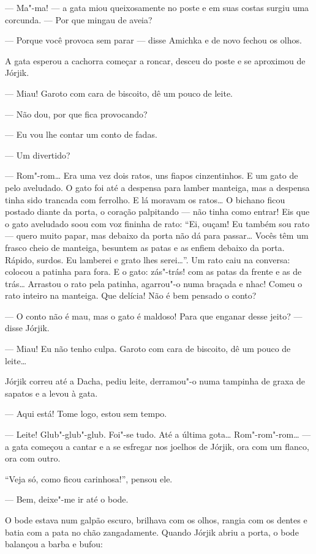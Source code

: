 --- Ma"-ma! --- a gata miou queixosamente no poste e em suas costas
surgiu uma corcunda. --- Por que mingau de aveia?

--- Porque você provoca sem parar --- disse Amichka e de novo fechou os
olhos.

A gata esperou a cachorra começar a roncar, desceu do poste e se
aproximou de Jórjik.

--- Miau! Garoto com cara de biscoito, dê um pouco de leite.

--- Não dou, por que fica provocando?

--- Eu vou lhe contar um conto de fadas.

--- Um divertido?

--- Rom"-rom\ldots{} Era uma vez dois ratos, uns fiapos cinzentinhos. E um
gato de pelo aveludado. O gato foi até a despensa para lamber manteiga,
mas a despensa tinha sido trancada com ferrolho. E lá moravam os
ratos\ldots{} O bichano ficou postado diante da porta, o coração palpitando
--- não tinha como entrar! Eis que o gato aveludado soou com voz fininha
de rato: ``Ei, ouçam! Eu também sou rato --- quero muito papar, mas
debaixo da porta não dá para passar\ldots{} Vocês têm um frasco cheio de
manteiga, besuntem as patas e as enfiem debaixo da porta. Rápido,
surdos. Eu lamberei e grato lhes serei\ldots{}''. Um rato caiu na conversa:
colocou a patinha para fora. E o gato: zás"-trás! com as patas da frente
e as de trás\ldots{} Arrastou o rato pela patinha, agarrou"-o numa braçada e
nhac! Comeu o rato inteiro na manteiga. Que delícia! Não é bem pensado o
conto?

--- O conto não é mau, mas o gato é maldoso! Para que enganar desse
jeito? --- disse Jórjik.

--- Miau! Eu não tenho culpa. Garoto com cara de biscoito, dê um pouco
de leite\ldots{}

Jórjik correu até a Dacha, pediu leite, derramou"-o numa tampinha de
graxa de sapatos e a levou à gata.

--- Aqui está! Tome logo, estou sem tempo.

--- Leite! Glub"-glub"-glub. Foi"-se tudo. Até a última gota\ldots{}
Rom"-rom"-rom\ldots{} --- a gata começou a cantar e a se esfregar nos joelhos
de Jórjik, ora com um flanco, ora com outro.

``Veja só, como ficou carinhosa!'', pensou ele.

--- Bem, deixe"-me ir até o bode.

O bode estava num galpão escuro, brilhava com os olhos, rangia com os
dentes e batia com a pata no chão zangadamente. Quando Jórjik abriu a
porta, o bode balançou a barba e bufou:

